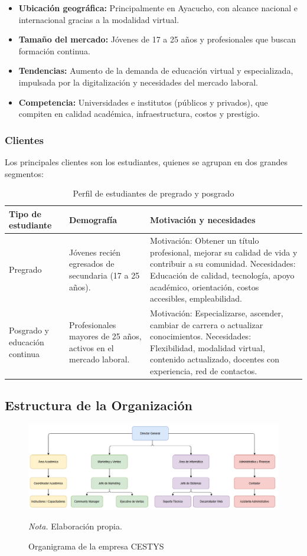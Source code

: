\begin{itemize}
	\item \textbf{Ubicación geográfica:} Principalmente en Ayacucho, con alcance nacional e internacional gracias a la modalidad virtual.
	\item \textbf{Tamaño del mercado:} Jóvenes de 17 a 25 años y profesionales que buscan formación continua.
	\item \textbf{Tendencias:} Aumento de la demanda de educación virtual y especializada, impulsada por la digitalización y necesidades del mercado laboral.
	\item \textbf{Competencia:} Universidades e institutos (públicos y privados), que compiten en calidad académica, infraestructura, costos y prestigio.
\end{itemize}

\subsubsection{Clientes}
Los principales clientes son los estudiantes, quienes se agrupan en dos grandes segmentos:
%
\begin{table}[H]
	\centering
	\caption{Perfil de estudiantes de pregrado y posgrado}
	\label{tab:perfil-estudiantes}
	\begin{tabular}{p{4cm} p{4cm} p{6cm}}
		\hline
		\textbf{Tipo de estudiante} & \textbf{Demografía} & \textbf{Motivación y necesidades} \\ \hline
		Pregrado & Jóvenes recién egresados de secundaria (17 a 25 años). & 
		Motivación: Obtener un título profesional, mejorar su calidad de vida y contribuir a su comunidad. 
		Necesidades: Educación de calidad, tecnología, apoyo académico, orientación, costos accesibles, empleabilidad. \\
		Posgrado y educación continua & Profesionales mayores de 25 años, activos en el mercado laboral. &
		Motivación: Especializarse, ascender, cambiar de carrera o actualizar conocimientos.
		Necesidades: Flexibilidad, modalidad virtual, contenido actualizado, docentes con experiencia, red de contactos. \\
		\hline
	\end{tabular}
\end{table}

%
\subsection{Estructura de la Organización}
\begin{figure}[H]
	\centering
	\caption{Organigrama de la empresa CESTYS}
	\label{fig:27-11-08-2025-13}
	\includegraphics[width=1\linewidth]{figuras/27-11-08-2025-13}
	\raggedright \textit{Nota.} Elaboración propia.
\end{figure}

